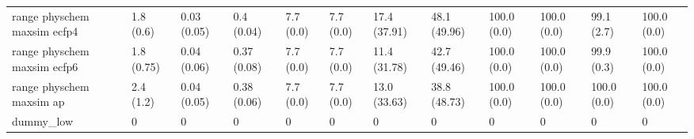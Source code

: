 \begin{tabular}{llllllllllll}
range physchem maxsim ecfp4 & {\cellcolor[HTML]{F5FBFD}} \color[HTML]{000000} 1.8 (0.6) & {\cellcolor[HTML]{F7FCFD}} \color[HTML]{000000} 0.03 (0.05) & {\cellcolor[HTML]{90D4C3}} \color[HTML]{000000} 0.4 (0.04) & {\cellcolor[HTML]{ECF8FB}} \color[HTML]{000000} 7.7 (0.0) & {\cellcolor[HTML]{ECF8FB}} \color[HTML]{000000} 7.7 (0.0) & {\cellcolor[HTML]{DBF2F2}} \color[HTML]{000000} 17.4 (37.91) & {\cellcolor[HTML]{6DC5A9}} \color[HTML]{000000} 48.1 (49.96) & {\cellcolor[HTML]{00441B}} \color[HTML]{F1F1F1} 100.0 (0.0) & {\cellcolor[HTML]{00441B}} \color[HTML]{F1F1F1} 100.0 (0.0) & {\cellcolor[HTML]{00471C}} \color[HTML]{F1F1F1} 99.1 (2.7) & {\cellcolor[HTML]{00441B}} \color[HTML]{F1F1F1} 100.0 (0.0) \\
range physchem maxsim ecfp6 & {\cellcolor[HTML]{F5FBFC}} \color[HTML]{000000} 1.8 (0.75) & {\cellcolor[HTML]{F7FCFD}} \color[HTML]{000000} 0.04 (0.06) & {\cellcolor[HTML]{9AD8CA}} \color[HTML]{000000} 0.37 (0.08) & {\cellcolor[HTML]{ECF8FB}} \color[HTML]{000000} 7.7 (0.0) & {\cellcolor[HTML]{ECF8FB}} \color[HTML]{000000} 7.7 (0.0) & {\cellcolor[HTML]{E7F6F9}} \color[HTML]{000000} 11.4 (31.78) & {\cellcolor[HTML]{84CFB9}} \color[HTML]{000000} 42.7 (49.46) & {\cellcolor[HTML]{00441B}} \color[HTML]{F1F1F1} 100.0 (0.0) & {\cellcolor[HTML]{00441B}} \color[HTML]{F1F1F1} 100.0 (0.0) & {\cellcolor[HTML]{00441B}} \color[HTML]{F1F1F1} 99.9 (0.3) & {\cellcolor[HTML]{00441B}} \color[HTML]{F1F1F1} 100.0 (0.0) \\
range physchem maxsim ap & {\cellcolor[HTML]{F2FAFC}} \color[HTML]{000000} 2.4 (1.2) & {\cellcolor[HTML]{F7FCFD}} \color[HTML]{000000} 0.04 (0.05) & {\cellcolor[HTML]{97D7C7}} \color[HTML]{000000} 0.38 (0.06) & {\cellcolor[HTML]{ECF8FB}} \color[HTML]{000000} 7.7 (0.0) & {\cellcolor[HTML]{ECF8FB}} \color[HTML]{000000} 7.7 (0.0) & {\cellcolor[HTML]{E4F5F8}} \color[HTML]{000000} 13.0 (33.63) & {\cellcolor[HTML]{94D6C5}} \color[HTML]{000000} 38.8 (48.73) & {\cellcolor[HTML]{00441B}} \color[HTML]{F1F1F1} 100.0 (0.0) & {\cellcolor[HTML]{00441B}} \color[HTML]{F1F1F1} 100.0 (0.0) & {\cellcolor[HTML]{00441B}} \color[HTML]{F1F1F1} 100.0 (0.0) & {\cellcolor[HTML]{00441B}} \color[HTML]{F1F1F1} 100.0 (0.0) \\
dummy_low & {\cellcolor[HTML]{F7FCFD}} \color[HTML]{000000} 0 & {\cellcolor[HTML]{F7FCFD}} \color[HTML]{000000} 0 & {\cellcolor[HTML]{F7FCFD}} \color[HTML]{000000} 0 & {\cellcolor[HTML]{F7FCFD}} \color[HTML]{000000} 0 & {\cellcolor[HTML]{F7FCFD}} \color[HTML]{000000} 0 & {\cellcolor[HTML]{F7FCFD}} \color[HTML]{000000} 0 & {\cellcolor[HTML]{F7FCFD}} \color[HTML]{000000} 0 & {\cellcolor[HTML]{F7FCFD}} \color[HTML]{000000} 0 & {\cellcolor[HTML]{F7FCFD}} \color[HTML]{000000} 0 & {\cellcolor[HTML]{F7FCFD}} \color[HTML]{000000} 0 & {\cellcolor[HTML]{F7FCFD}} \color[HTML]{000000} 0 \\

\end{tabular}
